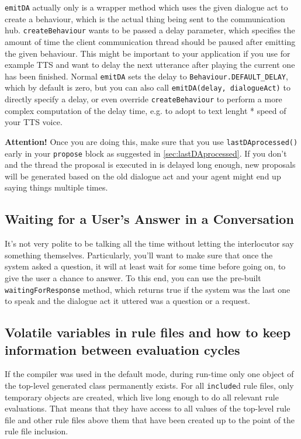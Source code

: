 \texttt{emitDA} actually only is a wrapper method which uses the given
dialogue act to create a behaviour, which is the actual thing being
sent to the communication hub. \texttt{createBehaviour} wants to be
passed a delay parameter, which specifies the amount of time the
client communication thread should be paused after emitting the given
behaviour. This might be important to your application if you use for
example TTS and want to delay the next utterance after playing the
current one has been finished.  Normal \texttt{emitDA} sets the delay
to \texttt{Behaviour.DEFAULT\_DELAY}, which by default is zero, but
you can also call \texttt{emitDA(delay, dialogueAct)} to directly
specify a delay, or even override \texttt{createBehaviour} to perform
a more complex computation of the delay time, e.g. to adopt to text
lenght * speed of your TTS voice.

\textbf{Attention!} Once you are doing this, make sure that you use
\texttt{lastDAprocessed()} early in your \texttt{propose} block as
suggested in \ref{sec:lastDAprocessed}. If you don't and the thread
the proposal is executed in is delayed long enough, new proposals will
be generated based on the old dialogue act and your agent might end up
saying things multiple times.

\subsection{Waiting for a User's Answer in a Conversation}

It's not very polite to be talking all the time without letting the
interlocutor say something themselves. Particularly, you'll want to
make sure that once the system asked a question, it will at least wait
for some time before going on, to give the user a chance to answer. To
this end, you can use the pre-built \texttt{waitingForResponse}
method, which returns true if the system was the last one to speak and
the dialogue act it uttered was a question or a request.

\subsection{Volatile variables in rule files and how to keep information between evaluation cycles} \label{sec:volatile}

If the compiler was used in the default mode, during run-time only one object
of the top-level generated class permanently exists. For all \texttt{include}d
rule files, only temporary objects are created, which live long enough to do
all relevant rule evaluations. That means that they have access to all values
of the top-level rule file and other rule files above them that have been
created up to the point of the rule file inclusion.

